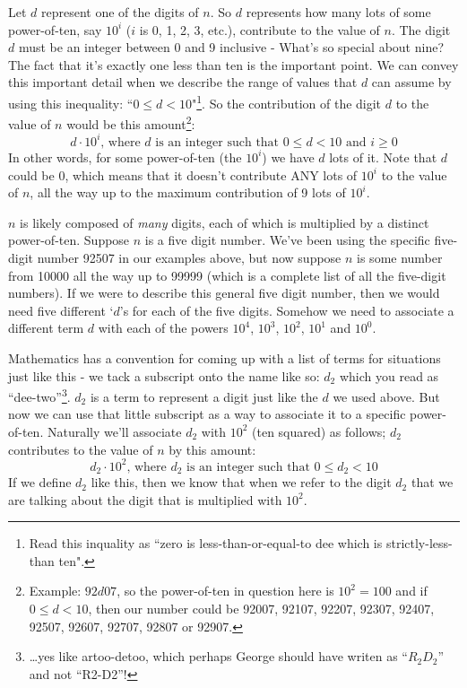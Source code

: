 \documentclass{article}
\begin{document}
Let $d$ represent one of the digits of $n$.
So $d$ represents how many lots of some power-of-ten,
say $10^i$  ($i$ is 0, 1, 2, 3, etc.),
contribute to the value of $n$.
The digit $d$ must be an integer between 0 and 9 inclusive -
What's so special about nine?  The fact that it's exactly one less than
ten is the important point. We can convey this important detail when
we describe the range of values that $d$ can assume by using
this inequality: ``$0\le{}d<10$"\footnote{Read this inquality as ``zero is
less-than-or-equal-to dee which is strictly-less-than ten".}. So the contribution of
the digit $d$ to the value of $n$ would be this amount\footnote{Example:
$92d07$, so the power-of-ten in question here is $10^2=100$ and if $0\le{}d<10$, then
our number could be
92007,
92107,
92207,
92307,
92407,
92507,
92607,
92707,
92807 or
92907.}:
\[d\cdot10^i\text{, where }d\text{ is an integer such
that }0\le{}d<10\text{ and }i\ge{}0\]
In other words, for some power-of-ten (the $10^i$) we
have $d$ lots of it. Note that $d$
could be 0, which means that it doesn't contribute ANY
lots of $10^i$ to the value of $n$, all the way up to the maximum
contribution of 9 lots of $10^i$.

$n$ is likely composed of \emph{many} digits,
each of which is multiplied by a distinct power-of-ten.
Suppose $n$ is a five digit number.
We've been using the specific five-digit number 92507 in our examples above,
but now suppose $n$ is some number from 10000 all
the way up to 99999 (which is a complete list of all the five-digit numbers).
If we were to describe this general five digit number, then we would need
five different `$d$'s for each of the five digits.
Somehow we need to associate a different term $d$ with each of the powers
$10^4$, $10^3$, $10^2$, $10^1$ and $10^0$.

Mathematics has a convention for coming up with
a list of terms for situations just like this -
we tack a subscript onto the name like so: $d_2$ which
you read as ``dee-two''\footnote{\dots{}yes like artoo-detoo, which perhaps
George should have writen as ``$R_2D_2$'' and not ``R2-D2''!}.
$d_2$ is a term to represent a digit just like the $d$ we used above.
But now we can use that little subscript as a way to
associate it to a specific power-of-ten.
Naturally we'll associate $d_2$ with $10^2$ (ten squared) as follows; $d_2$ contributes to
the value of $n$ by this amount:
\[d_2\cdot10^2\text{, where }d_2\text{ is an integer such that }0\le{}d_2<10\]
If we define $d_2$ like this, then we know that when we refer to the digit $d_2$
that we are talking about the digit that is multiplied with $10^2$.
\end{document}
